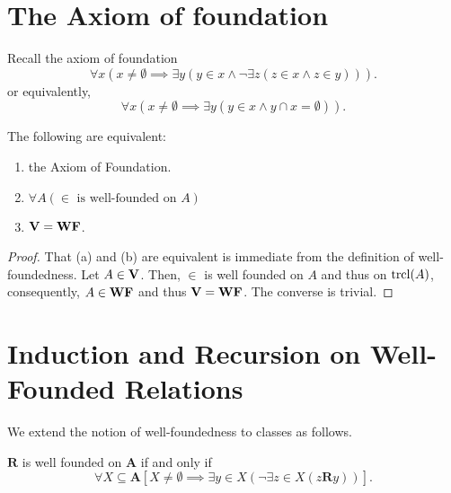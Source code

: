 \section{The Axiom of foundation}

Recall the axiom of foundation 
\begin{equation*}
    \forall x\left(x\ne\emptyset\implies\exists y\left(y\in x\wedge\neg\exists z\left(z\in x\wedge z\in y\right)\right)\right).
\end{equation*}
or equivalently, 
\begin{equation*}
    \forall x\left(x\ne\emptyset\implies\exists y\left(y\in x\wedge y\cap x = \emptyset\right)\right).
\end{equation*}

\begin{theorem}
    The following are equivalent:
    \begin{enumerate}[label=(\alph*)]
        \item the Axiom of Foundation. 
        \item $\forall A(\in\text{ is well-founded on }A)$
        \item $\mathbf{V} = \mathbf{WF}$.
    \end{enumerate}
\end{theorem}
\begin{proof}
    That (a) and (b) are equivalent is immediate from the definition of well-foundedness. Let $A\in\mathbf{V}$. Then, $\in$ is well founded on $A$ and thus on $\operatorname{tr cl}(A)$, consequently, $A\in\mathbf{WF}$ and thus $\mathbf{V} = \mathbf{WF}$. The converse is trivial.
\end{proof}

\section{Induction and Recursion on Well-Founded Relations}

We extend the notion of well-foundedness to classes as follows. 
\begin{definition}
    $\mathbf R$ is well founded on $\mathbf A$ if and only if 
    \begin{equation*}
        \forall X\subseteq\mathbf A\left[X\ne\emptyset\implies\exists y\in X\left(\neg\exists z\in X(z\mathbf R y)\right)\right].
    \end{equation*}
\end{definition}

